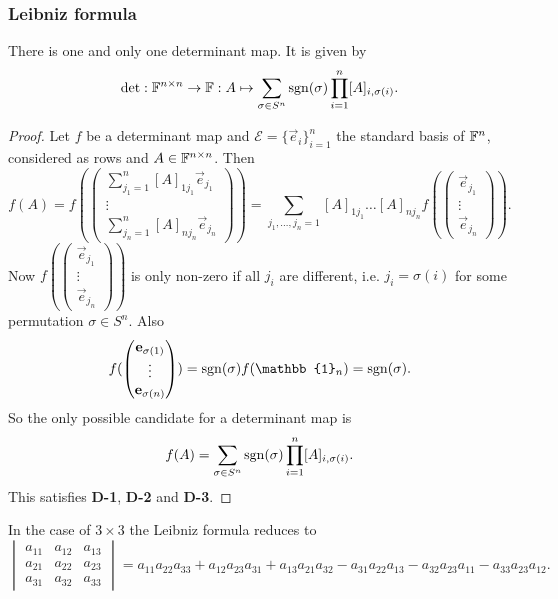 \subsubsection{Leibniz formula}
\begin{proposition}
There is one and only one determinant map. It is given by
\[ \det: \mathbb{F}^{n\times n}\to \mathbb{F}: A\mapsto \sum_{\sigma\in S^n}\operatorname{sgn}(\sigma)\prod_{i=1}^n[A]_{i,\sigma(i)}. \]
\end{proposition}
\begin{proof}
Let $f$ be a determinant map and $\mathcal{E} = \{\vec{e}_i\}_{i=1}^n$ the standard basis of $\mathbb{F}^n$, considered as rows and $A\in\mathbb{F}^{n\times n}$. Then
\[ f(A) = f(\begin{pmatrix}
\sum_{j_1=1}^n [A]_{1j_1}\vec{e}_{j_1} \\ \vdots \\ \sum_{j_n=1}^n [A]_{nj_n}\vec{e}_{j_n}
\end{pmatrix}) = \sum_{j_1,\ldots, j_n=1}[A]_{1j_1}\ldots[A]_{nj_n}f(\begin{pmatrix}
\vec{e}_{j_1} \\ \vdots \\ \vec{e}_{j_n}
\end{pmatrix}). \]
Now $f(\begin{pmatrix}
\vec{e}_{j_1} \\ \vdots \\ \vec{e}_{j_n}
\end{pmatrix})$ is only non-zero if all $j_i$ are different, i.e. $j_i = \sigma(i)$ for some permutation $\sigma\in S^n$. Also
\[ f(\begin{pmatrix}
\vec{e}_{\sigma(1)} \\ \vdots \\ \vec{e}_{\sigma(n)}
\end{pmatrix}) = \sgn(\sigma)f(\mathbb{1}_n) = \sgn(\sigma). \]
So the only possible candidate for a determinant map is
\[ f(A) = \sum_{\sigma\in S^n}\operatorname{sgn}(\sigma)\prod_{i=1}^n[A]_{i,\sigma(i)}. \]
This satisfies \textbf{D-1}, \textbf{D-2} and \textbf{D-3}.
\end{proof}
In the case of $3\times 3$ the Leibniz formula reduces to
\[ \begin{vmatrix}
a_{11} & a_{12} & a_{13} \\
a_{21} & a_{22} & a_{23} \\
a_{31} & a_{32} & a_{33}
\end{vmatrix} = a_{11}a_{22}a_{33} + a_{12}a_{23}a_{31} + a_{13}a_{21}a_{32} - a_{31}a_{22}a_{13} - a_{32}a_{23}a_{11} - a_{33}a_{23}a_{12}. \]
